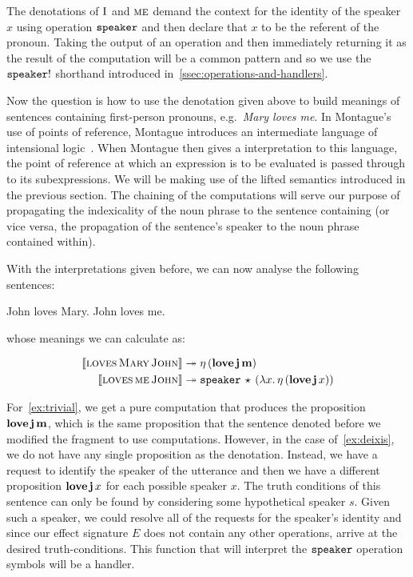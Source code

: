 The denotations of $\textsc{I}$ and $\textsc{me}$ demand the context for the
identity of the speaker $x$ using operation $\mathtt{speaker}$ and then declare
that $x$ to be the referent of the pronoun. Taking the output of an
operation and then immediately returning it as the result of the
computation will be a common pattern and so we use the $\mathtt{speaker}!$
shorthand introduced in~\ref{ssec:operations-and-handlers}.

Now the question is how to use the denotation given above to build meanings
of sentences containing first-person pronouns, e.g.\ \emph{Mary loves
  me}. In Montague's use of points of reference, Montague introduces an
intermediate language of intensional logic~\cite{montague1973proper}. When
Montague then gives a interpretation to this language, the point of
reference at which an expression is to be evaluated is passed through to
its subexpressions. We will be making use of the lifted semantics
introduced in the previous section. The chaining of the computations will
serve our purpose of propagating the indexicality of the noun phrase to the
sentence containing (or vice versa, the propagation of the sentence's
speaker to the noun phrase contained within).

With the interpretations given before, we can now analyse the following
sentences:

\begin{exe}
  \ex John loves Mary. \label{ex:trivial}
  \ex John loves me. \label{ex:deixis}
\end{exe}

whose meanings we can calculate as:

\NoChapterPrefix
\begin{align}
  \llbracket \textsc{loves}\,\textsc{Mary}\,\textsc{John} \rrbracket & \twoheadrightarrow 
  \eta\,(\textbf{love}\,\textbf{j}\,\textbf{m}) \\
  \llbracket \textsc{loves}\,\textsc{me}\,\textsc{John} \rrbracket & \twoheadrightarrow
  \mathtt{speaker}\,\star\,(\lambda x.\, \eta\,(\textbf{love}\,\textbf{j}\,x))
\end{align}
\ChapterPrefix

For~\eqref{ex:trivial}, we get a pure computation that produces the
proposition $\textbf{love}\,\textbf{j}\,\textbf{m}$, which is the same
proposition that the sentence denoted before we modified the fragment to
use computations. However, in the case of~\eqref{ex:deixis}, we do not have
any single proposition as the denotation. Instead, we have a request to
identify the speaker of the utterance and then we have a different
proposition $\textbf{love}\,\textbf{j}\,x$ for each possible speaker
$x$. The truth conditions of this sentence can only be found by considering
some hypothetical speaker $s$. Given such a speaker, we could resolve all
of the requests for the speaker's identity and since our effect signature
$E$ does not contain any other operations, arrive at the desired
truth-conditions. This function that will interpret the $\mathtt{speaker}$
operation symbols will be a handler.

